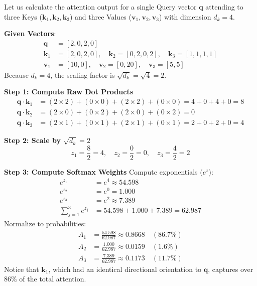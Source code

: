 \begin{example}
Let us calculate the attention output for a single Query vector $\mathbf{q}$ attending to three Keys ($\mathbf{k}_1, \mathbf{k}_2, \mathbf{k}_3$) and three Values ($\mathbf{v}_1, \mathbf{v}_2, \mathbf{v}_3$) with dimension $d_k = 4$.

\textbf{Given Vectors}:
\begin{align*}
\mathbf{q} &= [2, 0, 2, 0] \\
\mathbf{k}_1 &= [2, 0, 2, 0], \quad \mathbf{k}_2 = [0, 2, 0, 2], \quad \mathbf{k}_3 = [1, 1, 1, 1] \\
\mathbf{v}_1 &= [10, 0], \quad \mathbf{v}_2 = [0, 20], \quad \mathbf{v}_3 = [5, 5]
\end{align*}
Because $d_k = 4$, the scaling factor is $\sqrt{d_k} = \sqrt{4} = 2$.

\textbf{Step 1: Compute Raw Dot Products}
\begin{align*}
\mathbf{q} \cdot \mathbf{k}_1 &= (2 \times 2) + (0 \times 0) + (2 \times 2) + (0 \times 0) = 4 + 0 + 4 + 0 = 8 \\
\mathbf{q} \cdot \mathbf{k}_2 &= (2 \times 0) + (0 \times 2) + (2 \times 0) + (0 \times 2) = 0 \\
\mathbf{q} \cdot \mathbf{k}_3 &= (2 \times 1) + (0 \times 1) + (2 \times 1) + (0 \times 1) = 2 + 0 + 2 + 0 = 4
\end{align*}

\textbf{Step 2: Scale by $\sqrt{d_k} = 2$}
\begin{equation*}
z_1 = \frac{8}{2} = 4, \quad z_2 = \frac{0}{2} = 0, \quad z_3 = \frac{4}{2} = 2
\end{equation*}

\textbf{Step 3: Compute Softmax Weights}
Compute exponentials ($e^z$):
\begin{align*}
e^{z_1} &= e^4 \approx 54.598 \\
e^{z_2} &= e^0 = 1.000 \\
e^{z_3} &= e^2 \approx 7.389 \\
\sum_{j=1}^3 e^{z_j} &= 54.598 + 1.000 + 7.389 = 62.987
\end{align*}
Normalize to probabilities:
\begin{align*}
A_1 &= \frac{54.598}{62.987} \approx \mathbf{0.8668} \quad (86.7\%) \\
A_2 &= \frac{1.000}{62.987} \approx \mathbf{0.0159} \quad (1.6\%) \\
A_3 &= \frac{7.389}{62.987} \approx \mathbf{0.1173} \quad (11.7\%)
\end{align*}
Notice that $\mathbf{k}_1$, which had an identical directional orientation to $\mathbf{q}$, captures over $86\%$ of the total attention.


\end{example}
